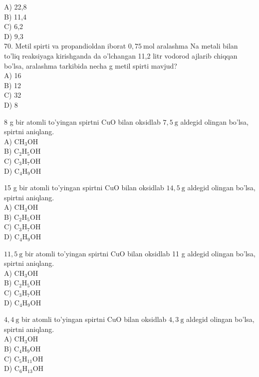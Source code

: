 A) 22,8\\
B) 11,4\\
C) 6,2\\
D) 9,3\\
70. Metil spirti va propandioldan iborat $0,75 \mathrm{~mol}$ aralashma Na metali bilan to'liq reaksiyaga kirishganda da o'lchangan 11,2 litr vodorod ajlarib chiqqan bo'lsa, aralashma tarkibida necha g metil spirti mavjud?\\
A) 16\\
B) 12\\
C) 32\\
D) 8
  \item 8 g bir atomli to'yingan spirtni CuO bilan oksidlab $7,5 \mathrm{~g}$ aldegid olingan bo'lsa, spirtni aniqlang.\\
A) $\mathrm{CH}_{3} \mathrm{OH}$\\
B) $\mathrm{C}_{2} \mathrm{H}_{5} \mathrm{OH}$\\
C) $\mathrm{C}_{3} \mathrm{H}_{7} \mathrm{OH}$\\
D) $\mathrm{C}_{4} \mathrm{H}_{9} \mathrm{OH}$
  \item 15 g bir atomli to'yingan spirtni CuO bilan oksidlab $14,5 \mathrm{~g}$ aldegid olingan bo'lsa, spirtni aniqlang.\\
A) $\mathrm{CH}_{3} \mathrm{OH}$\\
B) $\mathrm{C}_{2} \mathrm{H}_{5} \mathrm{OH}$\\
C) $\mathrm{C}_{3} \mathrm{H}_{7} \mathrm{OH}$\\
D) $\mathrm{C}_{4} \mathrm{H}_{9} \mathrm{OH}$
  \item $11,5 \mathrm{~g}$ bir atomli to'yingan spirtni CuO bilan oksidlab 11 g aldegid olingan bo'lsa, spirtni aniqlang.\\
A) $\mathrm{CH}_{3} \mathrm{OH}$\\
B) $\mathrm{C}_{2} \mathrm{H}_{5} \mathrm{OH}$\\
C) $\mathrm{C}_{3} \mathrm{H}_{7} \mathrm{OH}$\\
D) $\mathrm{C}_{4} \mathrm{H}_{9} \mathrm{OH}$
  \item $4,4 \mathrm{~g}$ bir atomli to'yingan spirtni CuO bilan oksidlab $4,3 \mathrm{~g}$ aldegid olingan bo'lsa, spirtni aniqlang.\\
A) $\mathrm{CH}_{3} \mathrm{OH}$\\
B) $\mathrm{C}_{4} \mathrm{H}_{9} \mathrm{OH}$\\
C) $\mathrm{C}_{5} \mathrm{H}_{11} \mathrm{OH}$\\
D) $\mathrm{C}_{6} \mathrm{H}_{13} \mathrm{OH}$
